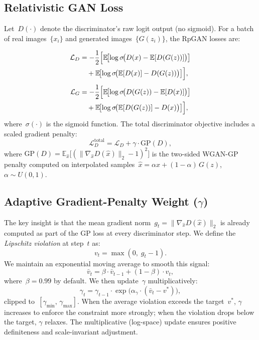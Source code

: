\documentclass[journal]{IEEEtran}
\newcommand{\vbar}{\bar{v}}
\newcommand{\vtarget}{v^{*}}
\begin{document}
\subsection{Relativistic GAN Loss}

Let~$D(\cdot)$ denote the discriminator's raw logit output (no sigmoid). For a batch of real images~$\{x_i\}$ and generated images~$\{G(z_i)\}$, the RpGAN losses are:

\begin{align}
\mathcal{L}_D &= -\frac{1}{2}\Bigl[
    \mathbb{E}\!\bigl[\log\sigma\!\bigl(D(x) - \mathbb{E}[D(G(z))]\bigr)\bigr] \notag\\
    &\quad + \mathbb{E}\!\bigl[\log\sigma\!\bigl(\mathbb{E}[D(x)] - D(G(z))\bigr)\bigr]
\Bigr], \label{eq:d_loss}\\[3pt]
\mathcal{L}_G &= -\frac{1}{2}\Bigl[
    \mathbb{E}\!\bigl[\log\sigma\!\bigl(D(G(z)) - \mathbb{E}[D(x)]\bigr)\bigr] \notag\\
    &\quad + \mathbb{E}\!\bigl[\log\sigma\!\bigl(\mathbb{E}[D(G(z))] - D(x)\bigr)\bigr]
\Bigr], \label{eq:g_loss}
\end{align}
where~$\sigma(\cdot)$ is the sigmoid function. The total discriminator objective includes a scaled gradient penalty:
\begin{equation}
    \mathcal{L}_{D}^{\mathrm{total}} = \mathcal{L}_D + \gamma \cdot \mathrm{GP}(D),
\label{eq:d_total}
\end{equation}
where $\mathrm{GP}(D) = \mathbb{E}_{\hat{x}}\!\bigl[(\|\nabla_{\hat{x}} D(\hat{x})\|_2 - 1)^2\bigr]$ is the two-sided WGAN-GP penalty computed on interpolated samples~$\hat{x} = \alpha x + (1{-}\alpha)\,G(z)$, $\alpha \sim U(0,1)$.

\subsection{Adaptive Gradient-Penalty Weight ($\gamma$)}
\label{sec:gamma}

The key insight is that the mean gradient norm~$g_t = \|\nabla_{\hat{x}} D(\hat{x})\|_2$ is already computed as part of the GP loss at every discriminator step. We define the \emph{Lipschitz violation} at step~$t$ as:
\begin{equation}
    v_t = \max(0,\; g_t - 1).
\label{eq:violation}
\end{equation}
We maintain an exponential moving average to smooth this signal:
\begin{equation}
    \vbar_t = \beta \cdot \vbar_{t-1} + (1-\beta) \cdot v_t,
\label{eq:ema}
\end{equation}
where~$\beta=0.99$ by default. We then update~$\gamma$ multiplicatively:
\begin{equation}
    \gamma_t = \gamma_{t-1} \cdot \exp\!\bigl(\alpha_\gamma \cdot (\vbar_t - \vtarget)\bigr),
\label{eq:gamma_update}
\end{equation}
clipped to~$[\gamma_{\min},\, \gamma_{\max}]$. When the average violation exceeds the target~$\vtarget$, $\gamma$ increases to enforce the constraint more strongly; when the violation drops below the target, $\gamma$ relaxes. The multiplicative (log-space) update ensures positive definiteness and scale-invariant adjustment.
\end{document}
